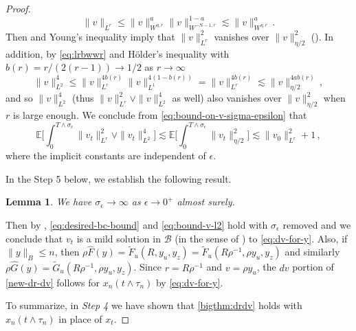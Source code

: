 \documentclass[final]{amsart}
\newtheorem{lem}[thm]{Lemma}
\numberwithin{thm}{section}
\numberwithin{equation}{section}
\newcommand{\E}{\mathbb{E}}
\newcommand{\B}{\mathcal{B}}
\begin{document}
\begin{proof}
    \begin{equation}\label{eq:lrbwwr}
    \|v\|_{L^r} \leq \|v\|_{W^{\eta,r}}^a\|v\|_{W^{-N-1,r}}^{1-a} \lesssim \|v\|_{W^{\eta,r}}^a \,.    
    \end{equation}
    Then  and Young's inequality imply that $\|v\|^2_{L^r}$ vanishes over $\|v\|_{\eta/2}^2$ (). In addition, by \eqref{eq:lrbwwr} and H\"{o}lder's inequality with $b(r) = r/(2(r-1)) \to 1/2$ as $r \to \infty$
    $$
    \|v\|_{L^2}^4 \leq \|v\|_{L^r}^{4b(r)}\|v\|_{L^1}^{4(1-b(r))} = \|v\|_{L^r}^{4b(r)} \lesssim \|v\|_{\eta/2}^{4ab(r)}
    \,,$$
    and so $\|v\|_{L^2}^4$ (thus $\|v\|_{L^r}^2 \vee \|v\|_{L^2}^4$ as well) also vanishes over $\|v\|_{\eta/2}^2$ when $r$ is large enough. We conclude from \eqref{eq:bound-on-v-sigma-epsilon} that
    \begin{equation}\label{eq:bound-v-l2}
        \E\Big[\int_0^{T \wedge \sigma_\epsilon} \|v_t\|_{L^r}^2 \vee \|v_t\|_{L^2}^4\Big] \lesssim \E\Big[\int_0^{T \wedge \sigma_\epsilon} \|v_t\|_{\eta/2}^2\Big] \lesssim \|v_0\|_{L^r}^2  +1 \,,
    \end{equation}
    where the implicit constants are independent of $\epsilon$. 

    In the Step 5 below, we establish the following result. 
    
    \begin{lem}\label{lem:consep}
    We have $\sigma_\epsilon \to \infty$ as $\epsilon \to 0^+$ almost surely. 
    \end{lem}
    
    
    Then by ,  \eqref{eq:desired-bc-bound} and \eqref{eq:bound-v-l2} hold with $\sigma_\epsilon$ removed and we conclude that $v_t$ is a mild solution in $\B$ (in the sense of ) to \eqref{eq:dv-for-y}. Also, if $\|y\|_B \leq n$, then  $\rho \hat F(y) = \tilde F_u(R,y_u,y_z) = \tilde F_u(R\rho^{-1},\rho y_u,y_z)$ and similarly $\rho\hat G(y) = \tilde G_u(R\rho^{-1}, \rho y_u,y_z)$. Since $r = R\rho^{-1}$ and $v = \rho y_u$, the $dv$ portion of \eqref{new-dr-dv} follows for $x_n(t \wedge \tau_n)$ by \eqref{eq:dv-for-y}.

    To summarize, in \textit{Step 4} we have shown that \ref{bigthm:drdv} holds with $x_n(t \wedge \tau_n)$ in place of $x_t$.
    
    


    
    
    
    

\end{proof}
\end{document}
